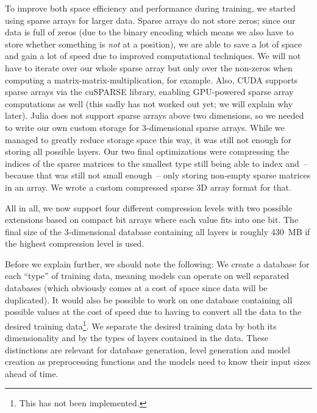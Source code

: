 To improve both space efficiency and performance during training, we
started using sparse arrays for larger data. Sparse arrays do not
store zeros; since our data is full of zeros (due to the binary
encoding which means we also have to store whether something is
\emph{not} at a position), we are able to save a lot of space and gain
a lot of speed due to improved computational techniques. We will not
have to iterate over our whole sparse array but only over the
non-zeros when computing a matrix-matrix-multiplication, for example.
Also, CUDA supports sparse arrays via the cuSPARSE library, enabling
GPU-powered sparse array computations as well (this sadly has not
worked out yet; we will explain why later).
Julia does not support sparse arrays above two dimensions, so we
needed to write our own custom storage for 3-dimensional sparse
arrays. While we managed to greatly reduce storage space this way, it
was still not enough for storing all possible layers. Our two final
optimizations were compressing the indices of the sparse matrices to
the smallest type still being able to index and~-- because that was
still not small enough~-- only storing non-empty sparse matrices in an
array. We wrote a custom compressed sparse 3D array format for that.

All in all, we now support four different compression levels with two
possible extensions based on compact bit arrays where each value fits
into one bit. The final size of the 3-dimensional database containing
all layers is roughly 430~MB if the highest compression level is used.
\medskip

Before we explain further, we should note the following: We create a
database for each ``type'' of training data, meaning models can
operate on well separated databases (which obviously comes at a cost
of space since data will be duplicated). It would also be possible to
work on one database containing all possible values at the cost of
speed due to having to convert all the data to the desired training
data\footnote{This has not been implemented.}. We separate the desired
training data by both its dimensionality and by the types of layers
contained in the data. These distinctions are relevant for database
generation, level generation and model creation as preprocessing
functions and the models need to know their input sizes ahead of time.

